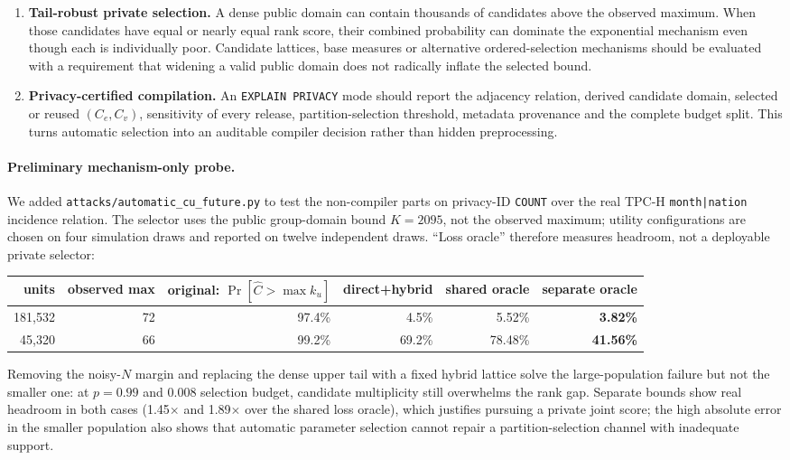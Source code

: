 \documentclass[11pt,a4paper]{article}
\newcommand{\ku}{k_u}
\begin{document}
\begin{enumerate}
\item \textbf{Tail-robust private selection.} A dense public domain can contain thousands of
candidates above the observed maximum. When those candidates have equal or nearly equal rank
score, their combined probability can dominate the exponential mechanism even though each is
individually poor. Candidate lattices, base measures or alternative ordered-selection mechanisms
should be evaluated with a requirement that widening a valid public domain does not radically
inflate the selected bound.

\item \textbf{Privacy-certified compilation.} An \texttt{EXPLAIN PRIVACY} mode should report the
adjacency relation, derived candidate domain, selected or reused $(C_e,C_v)$, sensitivity of every
release, partition-selection threshold, metadata provenance and the complete budget split. This
turns automatic selection into an auditable compiler decision rather than hidden preprocessing.
\end{enumerate}

\paragraph{Preliminary mechanism-only probe.} We added
\texttt{attacks/automatic\_cu\_future.py} to test the non-compiler parts on privacy-ID
\texttt{COUNT} over the real TPC-H \texttt{month|nation} incidence relation. The selector uses the
public group-domain bound $K=2095$, not the observed maximum; utility configurations are chosen on
four simulation draws and reported on twelve independent draws. ``Loss oracle'' therefore measures
headroom, not a deployable private selector:

\begin{center}\small
\begin{tabular}{rrrrrr}
\toprule
units & observed max & original: $\Pr[\hat C>\max\ku]$ & direct+hybrid & shared oracle & separate oracle \\
\midrule
181,532 & 72 & 97.4\% & 4.5\% & 5.52\% & \textbf{3.82\%} \\
45,320  & 66 & 99.2\% & 69.2\% & 78.48\% & \textbf{41.56\%} \\
\bottomrule
\end{tabular}
\end{center}

Removing the noisy-$N$ margin and replacing the dense upper tail with a fixed hybrid lattice solve
the large-population failure but not the smaller one: at $p=0.99$ and $0.008$ selection budget,
candidate multiplicity still overwhelms the rank gap. Separate bounds show real headroom in both
cases (1.45$\times$ and 1.89$\times$ over the shared loss oracle), which justifies pursuing a
private joint score; the high absolute error in the smaller population also shows that automatic
parameter selection cannot repair a partition-selection channel with inadequate support.
\end{document}
